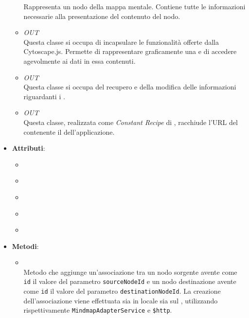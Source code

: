 \begin{itemize}
\begin{itemize}
Rappresenta un nodo della mappa mentale. Contiene tutte le informazioni necessarie alla presentazione del contenuto del nodo.
\item \textit{OUT} \hyperref[\nogloxy{Premi::Front-End::Services::MindmapAdapterService}]{}\\
Questa classe si occupa di incapsulare le funzionalità offerte dalla  Cytoscape.js. Permette di rappresentare graficamente una  e di accedere agevolmente ai dati in essa contenuti.
\item \textit{OUT} \hyperref[\nogloxy{Premi::Front-End::Services::ProjectService}]{}\\
Questa classe si occupa del recupero e della modifica delle informazioni riguardanti i .
\item \textit{OUT} \hyperref[\nogloxy{Premi::Front-End::Services::ServerURL}]{}\\
Questa classe, realizzata come \textit{Constant Recipe} di , racchiude l'URL del  contenente il  dell'applicazione.
\end{itemize}
\item \textbf{Attributi}:
\begin{itemize}
\item {}
\\ \dpMindMapServiceField
\item {}
\\ \dpProjectServiceField
\item {}
\\ \dpConstantServiceField
\item {}
\\ \dpHttpField
\item {}
\\ \dpQField
\end{itemize}
\item \textbf{Metodi}:
\begin{itemize}
\item {}
\\ Metodo che aggiunge un'associazione tra un nodo sorgente avente come \texttt{id} il valore del parametro \texttt{sourceNodeId} e un nodo destinazione avente come \texttt{id} il valore del parametro \texttt{destinationNodeId}. La creazione dell'associazione viene effettuata sia in locale sia sul , utilizzando rispettivamente \texttt{MindmapAdapterService} e \texttt{\$http}. \dpReturnPromiseNoValue

\end{itemize}
\end{itemize}
